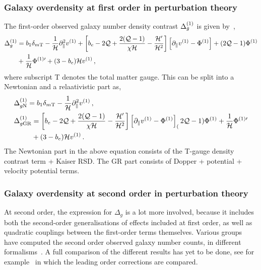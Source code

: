 \subsubsection{Galaxy overdensity at first order in perturbation theory}

The first-order observed galaxy number density contrast $\Delta_g^{(1)}$ is given by~\cite{Jolicoeur:2017eyi}, 
\begin{align}
	\Delta_g^{(1)} &= b_1 \delta_{m\mathrm{T}} - \frac{1}{\mathcal{H}} \partial_\parallel^2 v^{(1)} + \left[ b_e - 2 \mathcal{Q} + \frac{2 (\mathcal{Q} - 1)}{\chi \mathcal{H}} - \frac{\mathcal{H}'}{\mathcal{H}^2} \right] \left[ \partial_\parallel v^{(1)} - \Phi^{(1)} \right] + (2 \mathcal{Q} - 1) \Phi^{(1)} \nonumber \\
	&+ \frac{1}{\mathcal{H}} \Phi^{{(1)} \prime} + (3 - b_e) \mathcal{H} v^{(1)}\,,
\end{align}
where subscript T denotes the total matter gauge. This can be split into a Newtonian and a relaativistic part as, 
\begin{align}
	&\Delta_{g\nw}^\on = b_1 \delta_{m\mathrm{T}} - \frac{1}{\cH} \partial_\parallel^2 v^\on\,,\label{eq:DeltagNFO}\\
	&\Delta_{g\gr}^\on = \left[ b_e - 2 \Q + \frac{2 (\Q - 1)}{\chi \cH} - \frac{\cH'}{\cH^2} \right] \left[ \partial_\parallel v^\on - \Phi^\on \right] _ (2 \Q - 1) \Phi^\on + \frac{1}{\cH} \Phi^{\on \prime} \nonumber \\
	& \hphantom{\Delta_{g\gr}} + (3 - b_e) \cH v^\on\,\label{eq:DeltagGRFO}.
\end{align}
The Newtonian part in the above equation consists of the T-gauge density contrast term + Kaiser RSD. The GR part consists of Dopper + potential + velocity potential terms.

\subsubsection{Galaxy overdensity at second order in perturbation theory}

At second order, the expression for $\Delta_g$ is a lot more involved, because it includes both the second-order generalisations of effects included at first order, as well as quadratic couplings between the first-order terms themselves. Various groups have computed the second order observed galaxy number counts, in different formalisms~\cite{DiDio:2014lka,Fuentes:2019nel,Bertacca:2014dra,Bertacca:2014wga,Yoo:2014sfa}. A full comparison of the different results has yet to be done, see for example~\cite{Fuentes:2020qby} in which the leading order corrections are compared.

